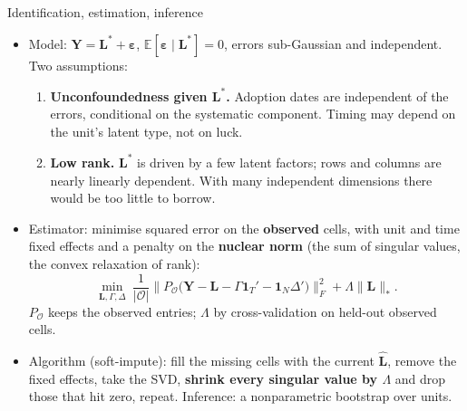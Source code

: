 \documentclass[
  11pt,
  ignorenonframetext,
  aspectratio=169,
]{beamer}
\providecommand{\tightlist}{%
  \setlength{\itemsep}{0pt}\setlength{\parskip}{0pt}}
\begin{document}
\begin{frame}{Identification, estimation, inference}
\protect{}\label{identification-estimation-inference}
\begin{itemize}
\tightlist
\item
  Model: \(\mathbf Y = \mathbf L^{*} + \boldsymbol\varepsilon\),
  \(\mathbb E[\boldsymbol\varepsilon \mid \mathbf L^{*}] = 0\), errors
  sub-Gaussian and independent. Two assumptions:

  \begin{enumerate}
  \tightlist
  \item
    \textbf{Unconfoundedness given \(\mathbf L^{*}\).} Adoption dates
    are independent of the errors, conditional on the systematic
    component. Timing may depend on the unit's latent type, not on luck.
  \item
    \textbf{Low rank.} \(\mathbf L^{*}\) is driven by a few latent
    factors; rows and columns are nearly linearly dependent. With many
    independent dimensions there would be too little to borrow.
  \end{enumerate}
\item
  Estimator: minimise squared error on the \textbf{observed} cells, with
  unit and time fixed effects and a penalty on the \textbf{nuclear norm}
  (the sum of singular values, the convex relaxation of rank): \[
  \min_{\mathbf L, \Gamma, \Delta}\ \frac{1}{|\mathcal O|} \big\| P_{\mathcal O}\big( \mathbf Y - \mathbf L - \Gamma \mathbf 1_T' - \mathbf 1_N \Delta' \big) \big\|_F^2 + \Lambda \| \mathbf L \|_{*}.
  \] \(P_{\mathcal O}\) keeps the observed entries; \(\Lambda\) by
  cross-validation on held-out observed cells.
\item
  Algorithm (soft-impute): fill the missing cells with the current
  \(\hat{\mathbf L}\), remove the fixed effects, take the SVD,
  \textbf{shrink every singular value by \(\Lambda\)} and drop those
  that hit zero, repeat. Inference: a nonparametric bootstrap over
  units.
\end{itemize}
\end{frame}
\end{document}
